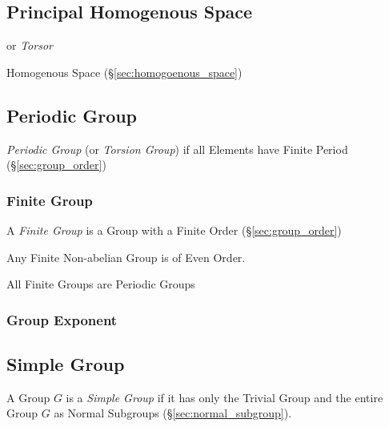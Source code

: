 \subsection{Principal Homogenous Space}\label{sec:principal_homogenous_space}

or \emph{Torsor}

Homogenous Space (\S\ref{sec:homogoenous_space})



\subsection{Periodic Group}\label{sec:periodic_group}

\emph{Periodic Group} (or \emph{Torsion Group}) if all Elements have
Finite Period (\S\ref{sec:group_order})



\subsubsection{Finite Group}\label{sec:finite_group}

A \emph{Finite Group} is a Group with a Finite Order
(\S\ref{sec:group_order})

Any Finite Non-abelian Group is of Even Order.

All Finite Groups are Periodic Groups



\subsubsection{Group Exponent}\label{sec:group_exponent}



\subsection{Simple Group}\label{sec:simple_group}

A Group $G$ is a \emph{Simple Group} if it has only the Trivial Group
and the entire Group $G$ as Normal Subgroups
(\S\ref{sec:normal_subgroup}).

